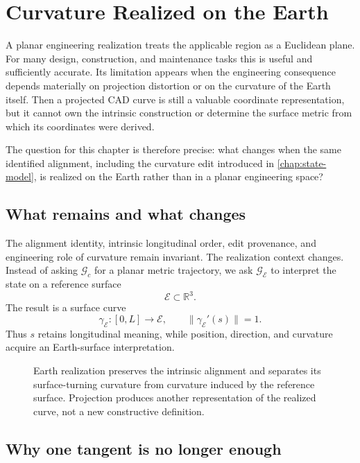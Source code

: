 
\chapter{Curvature Realized on the Earth}
\label{chapter:ellipsoid_curvature}

A planar engineering realization treats the applicable region as a
Euclidean plane. For many design, construction, and maintenance tasks
this is useful and sufficiently accurate. Its limitation appears when
the engineering consequence depends materially on projection distortion
or on the curvature of the Earth itself. Then a projected CAD curve is
still a valuable coordinate representation, but it cannot own the
intrinsic construction or determine the surface metric from which its
coordinates were derived.

The question for this chapter is therefore precise: what changes when
the same identified alignment, including the curvature edit introduced
in \cref{chap:state-model}, is realized on the Earth rather than in a
planar engineering space?

\section{What remains and what changes}

The alignment identity, intrinsic longitudinal order, edit provenance,
and engineering role of curvature remain invariant. The realization
context changes. Instead of asking \(\mathcal G_c\) for a planar metric
trajectory, we ask \(\mathcal G_{\mathcal E}\) to interpret the state on
a reference surface
\[
\mathcal E\subset\mathbb R^3.
\]
The result is a surface curve
\[
\gamma_{\mathcal E}:[0,L]\rightarrow\mathcal E,
\qquad \lVert\gamma_{\mathcal E}'(s)\rVert=1.
\]
Thus \(s\) retains longitudinal meaning, while position, direction, and
curvature acquire an Earth-surface interpretation.

\begin{figure}[htbp]
\centering

\caption{Earth realization preserves the intrinsic alignment and
separates its surface-turning curvature from curvature induced by the
reference surface. Projection produces another representation of the
realized curve, not a new constructive definition.}
\label{fig:earth-realization-decomposition}
\end{figure}

\section{Why one tangent is no longer enough}

